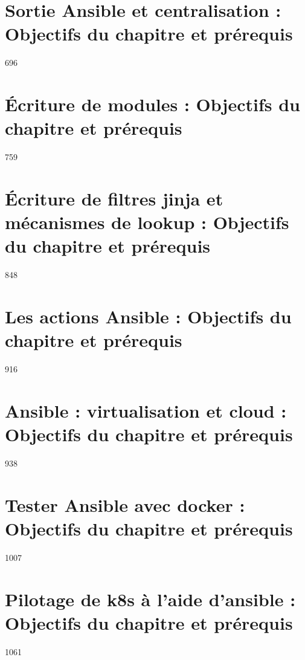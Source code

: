 \documentclass[hidelinks]{article}
\begin{document}
\section{Sortie Ansible et centralisation : Objectifs du chapitre et prérequis}
\label{sec:Sortie Ansible et centralisation}
696

\section{Écriture de modules : Objectifs du chapitre et prérequis}
\label{sec:Écriture de modules}
759

\section{Écriture de filtres jinja et mécanismes de lookup : Objectifs du chapitre et prérequis}
\label{sec:Écriture de filtres jinja et mécanismes de lookup}
848

\section{Les actions Ansible : Objectifs du chapitre et prérequis}
\label{sec:Les actions Ansible}
916

\section{Ansible : virtualisation et cloud : Objectifs du chapitre et prérequis}
\label{sec:Ansible - virtualisation et cloud}
938

\section{Tester Ansible avec docker : Objectifs du chapitre et prérequis}
\label{sec:Tester Ansible avec docker}
1007

\section{Pilotage de k8s à l'aide d'ansible : Objectifs du chapitre et prérequis}
\label{sec:Pilotage de k8s à l'aide d'ansible}
1061
\end{document}
